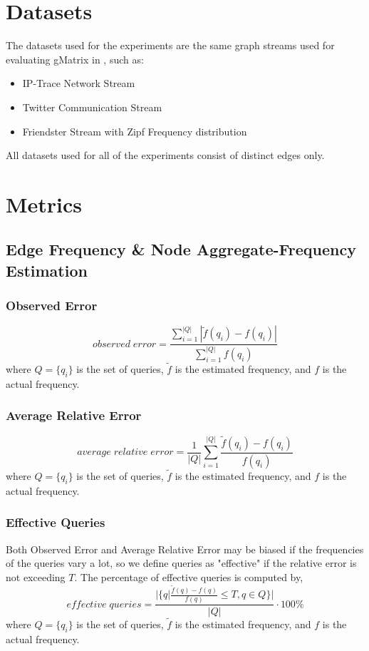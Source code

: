 \section{Datasets}
The datasets used for the experiments are the same graph streams used for evaluating gMatrix in \cite{khan}, such as:

\begin{itemize}
\item IP-Trace Network Stream \cite{khan}
\item Twitter Communication Stream \cite{khan}
\item Friendster Stream with Zipf Frequency distribution \cite{khan}
\end{itemize}

All datasets used for all of the experiments consist of distinct edges only.

\section{Metrics}
\subsection{Edge Frequency \& Node Aggregate-Frequency Estimation}
\subsubsection{Observed Error \cite{khan}}
\[
observed\;error = \frac{ \sum_{i=1}^{|Q|}{|\tilde{f}(q_i) - f(q_i)|} }{\sum_{i=1}^{|Q|}f(q_i)}
\]
where $Q = \{q_i\}$ is the set of queries, $\tilde{f}$ is the estimated frequency, and $f$ is the actual frequency.

\subsubsection{Average Relative Error \cite{DBLP}}
\[
average\;relative\;error = \frac{1}{|Q|} \sum_{i=1}^{|Q|} \frac{\tilde{f}(q_i)-f(q_i)}{f(q_i)}
\]
where $Q = \{q_i\}$ is the set of queries, $\tilde{f}$ is the estimated frequency, and $f$ is the actual frequency.

\subsubsection{Effective Queries \cite{DBLP}}
Both Observed Error and Average Relative Error may be biased if the frequencies of the queries vary a lot, so we define queries as "effective" if the relative error is not exceeding $T$. The percentage of effective queries is computed by,
\[
effective\;queries = \frac{|\{q|\frac{\tilde{f}(q)-f(q)}{f(q)} \leq T, q \in Q\}|}{|Q|} \cdot 100\%
\]
where $Q = \{q_i\}$ is the set of queries, $\tilde{f}$ is the estimated frequency, and $f$ is the actual frequency.


